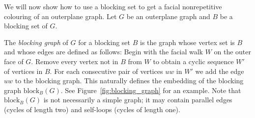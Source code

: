 \documentclass{patmorin}
\newcommand{\block}{\mathrm{block}}
\begin{document}
We will now show how to use a blocking set to get a facial nonrepetitive
colouring of an outerplane graph. Let $G$ be an outerplane graph and $B$
be a blocking set of $G$. 

The \emph{blocking graph} of $G$ for a blocking set $B$ is the graph
whose vertex set is $B$ and whose edges are defined as follows:  Begin
with the facial walk $W$ on the outer face of $G$. Remove every vertex
 not in $B$ from $W$ to obtain a cyclic sequence $W'$ of vertices in
$B$. For each consecutive pair of vertices $uw$ in $W'$ we add the edge
 $uw$ to the blocking graph.  This naturally defines the embedding of
 the blocking graph $\block_B(G)$. See Figure~\ref{fig:blocking_graph}
 for an example.   Note that $\block_B(G)$ is not necessarily a simple
graph; it may contain parallel edges (cycles of length two) and self-loops
(cycles of length one). 
\end{document}
